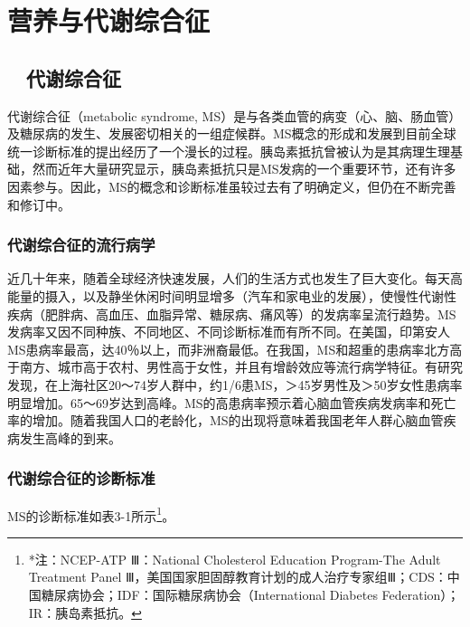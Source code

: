 \chapter{营养与代谢综合征}

\hypertarget{text00004.htmlux5cux23mllj1}{%
\section{　代谢综合征}\label{text00004.htmlux5cux23mllj1}}

代谢综合征（metabolic syndrome,
MS）是与各类血管的病变（心、脑、肠血管）及糖尿病的发生、发展密切相关的一组症候群。MS概念的形成和发展到目前全球统一诊断标准的提出经历了一个漫长的过程。胰岛素抵抗曾被认为是其病理生理基础，然而近年大量研究显示，胰岛素抵抗只是MS发病的一个重要环节，还有许多因素参与。因此，MS的概念和诊断标准虽较过去有了明确定义，但仍在不断完善和修订中。

\hypertarget{text00004.htmlux5cux23mllj2}{%
\subsection{代谢综合征的流行病学}\label{text00004.htmlux5cux23mllj2}}

近几十年来，随着全球经济快速发展，人们的生活方式也发生了巨大变化。每天高能量的摄入，以及静坐休闲时间明显增多（汽车和家电业的发展），使慢性代谢性疾病（肥胖病、高血压、血脂异常、糖尿病、痛风等）的发病率呈流行趋势。MS发病率又因不同种族、不同地区、不同诊断标准而有所不同。在美国，印第安人MS患病率最高，达40％以上，而非洲裔最低。在我国，MS和超重的患病率北方高于南方、城市高于农村、男性高于女性，并且有增龄效应等流行病学特征。有研究发现，在上海社区20～74岁人群中，约1/6患MS，＞45岁男性及＞50岁女性患病率明显增加。65～69岁达到高峰。MS的高患病率预示着心脑血管疾病发病率和死亡率的增加。随着我国人口的老龄化，MS的出现将意味着我国老年人群心脑血管疾病发生高峰的到来。

\hypertarget{text00004.htmlux5cux23mllj3}{%
\subsection{代谢综合征的诊断标准}\label{text00004.htmlux5cux23mllj3}}

MS的诊断标准如表3-1所示\footnote{*注：NCEP-ATP Ⅲ：National Cholesterol Education Program-The Adult
Treatment Panel
Ⅲ，美国国家胆固醇教育计划的成人治疗专家组Ⅲ；CDS：中国糖尿病协会；IDF：国际糖尿病协会（International
Diabetes Federation）；IR：胰岛素抵抗。}。

